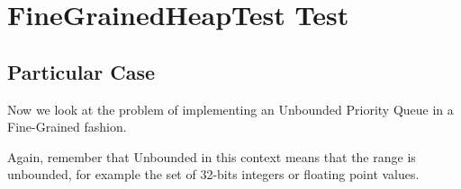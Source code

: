 \section{\textbf{FineGrainedHeapTest Test}}
\subsection{Particular Case}
\par
Now we look at the problem of implementing an Unbounded Priority Queue in a
Fine-Grained fashion. 
\par
Again, remember that Unbounded in this context means that the range is
unbounded, for example the set of 32-bits integers or floating point values.
\par
